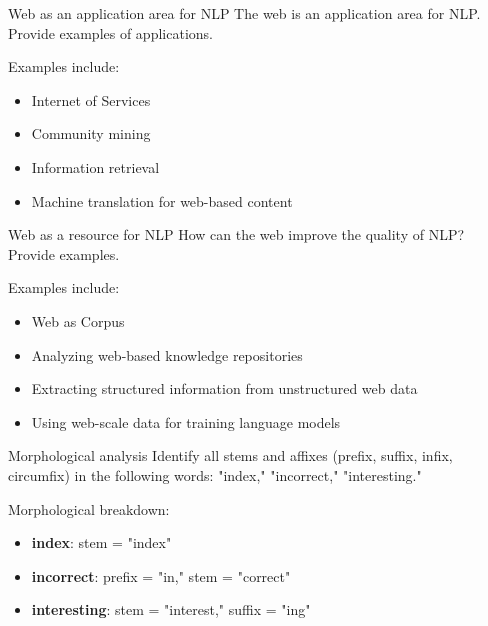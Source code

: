 \documentclass{article}
\author{Leopold Lemmermann}
\begin{document}
\createtitle


\begin{exercise}{Web as an application area for NLP}
  The web is an application area for NLP. Provide examples of applications.

  \begin{solution}
    Examples include:
    \begin{itemize}
        \item Internet of Services
        \item Community mining
        \item Information retrieval
        \item Machine translation for web-based content
    \end{itemize}
  \end{solution}
\end{exercise}

\begin{exercise}{Web as a resource for NLP}
  How can the web improve the quality of NLP? Provide examples.

  \begin{solution}
    Examples include:
    \begin{itemize}
        \item Web as Corpus
        \item Analyzing web-based knowledge repositories
        \item Extracting structured information from unstructured web data
        \item Using web-scale data for training language models
    \end{itemize}
  \end{solution}
\end{exercise}

\begin{exercise}{Morphological analysis}
  Identify all stems and affixes (prefix, suffix, infix, circumfix) in the following words: "index," "incorrect," "interesting."

  \begin{solution}
    Morphological breakdown:
    \begin{itemize}
        \item \textbf{index}: stem = "index"
        \item \textbf{incorrect}: prefix = "in," stem = "correct"
        \item \textbf{interesting}: stem = "interest," suffix = "ing"
    \end{itemize}
  \end{solution}
\end{exercise}
\end{document}
